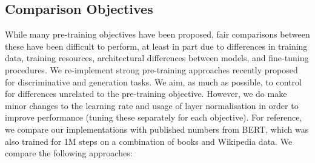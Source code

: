 \documentclass{article} %
\newcommand{\todo}[1]{{\color{red} #1}}
\begin{document}
\subsection{Comparison Objectives}
\label{sec:baselines}
While many pre-training objectives have been proposed, fair comparisons between these have been difficult to perform, at least in part due to differences in training data, training resources, architectural differences between models, and fine-tuning procedures. 
We re-implement strong pre-training approaches recently proposed for discriminative and generation tasks.
We aim, as much as possible, to control for differences unrelated to the pre-training objective.
However, we do make minor changes to the learning rate and usage of layer normalisation in order to improve performance (tuning these separately for each objective). %
For reference, we compare our implementations with published numbers from BERT, which was also trained for 1M steps on a combination of books and Wikipedia data.
We compare the following approaches:
\end{document}
